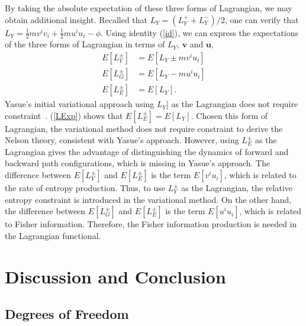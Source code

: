 \documentclass[%
 aip, 
 amsmath,amssymb,amsthm,
 nofootinbib,
 reprint,
]{revtex4-1}
\begin{document}
By taking the absolute expectation of these three forms of Lagrangian, we may obtain additional insight. Recalled that $L_Y=(L_Y^++L_Y^-)/2$, one can verify that $L_Y=\frac{1}{2}mv^iv_i+\frac{1}{2}mu^iu_i-\phi$. Using identity (\ref{id}), we can express the expectations of the three forms of Lagrangian in terms of $L_Y$, $\mathbf{v}$ and $\mathbf{u}$,
\begin{equation}
    \label{LExp}
    \begin{split}
    E[L_Y^{\pm}]&=E[L_Y \pm mv^iu_i] \\
    E[L_G^{\pm}]&=E[L_Y-mu^iu_i] \\
    E[L_E^{\pm}]&=E[L_Y].
    \end{split}
\end{equation}
Yasue's initial variational approach using $L_Y]$ as the Lagrangian does not require constraint~\cite{Yasue}. (\ref{LExp}) shows that $E[L_E^{\pm}]=E[L_Y]$. Chosen this form of Lagrangian, the variational method does not require constraint to derive the Nelson theory, consistent with Yasue's approach. However, using $L_E^{\pm}$ as the Lagrangian gives the advantage of distinguishing the dynamics of forward and backward path configurations, which is missing in Yasue's approach. The difference between $E[L_Y^{\pm}]$ and $E[L_E^{\pm}]$ is the term $E[v^iu_i]$, which is related to the rate of entropy production. Thus, to use $L_Y^{\pm}$ as the Lagrangian, the relative entropy constraint is introduced in the variational method. On the other hand, the difference between $E[L_G^{\pm}]$ and $E[L_E^{\pm}]$ is the term $E[u^iu_i]$, which is related to Fisher information. Therefore, the Fisher information production is needed in the Lagrangian functional.

\section{Discussion and Conclusion}
\label{sec:conclusion}

\subsection{Degrees of Freedom}
\end{document}
